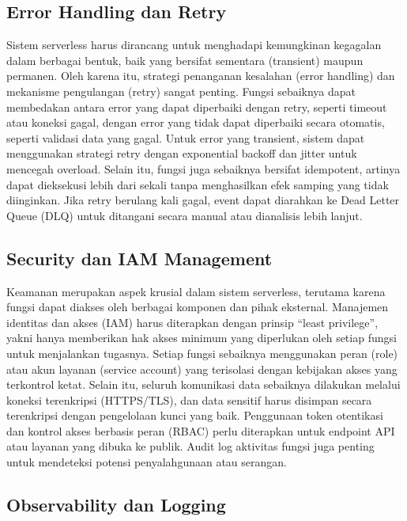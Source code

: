 \subsection{Error Handling dan Retry}

Sistem serverless harus dirancang untuk menghadapi kemungkinan kegagalan dalam berbagai bentuk, baik yang bersifat sementara (transient) maupun permanen. Oleh karena itu, strategi penanganan kesalahan (error handling) dan mekanisme pengulangan (retry) sangat penting. Fungsi sebaiknya dapat membedakan antara error yang dapat diperbaiki dengan retry, seperti timeout atau koneksi gagal, dengan error yang tidak dapat diperbaiki secara otomatis, seperti validasi data yang gagal. Untuk error yang transient, sistem dapat menggunakan strategi retry dengan exponential backoff dan jitter untuk mencegah overload. Selain itu, fungsi juga sebaiknya bersifat idempotent, artinya dapat dieksekusi lebih dari sekali tanpa menghasilkan efek samping yang tidak diinginkan. Jika retry berulang kali gagal, event dapat diarahkan ke Dead Letter Queue (DLQ) untuk ditangani secara manual atau dianalisis lebih lanjut.

\subsection{Security dan IAM Management}

Keamanan merupakan aspek krusial dalam sistem serverless, terutama karena fungsi dapat diakses oleh berbagai komponen dan pihak eksternal. Manajemen identitas dan akses (IAM) harus diterapkan dengan prinsip “least privilege”, yakni hanya memberikan hak akses minimum yang diperlukan oleh setiap fungsi untuk menjalankan tugasnya. Setiap fungsi sebaiknya menggunakan peran (role) atau akun layanan (service account) yang terisolasi dengan kebijakan akses yang terkontrol ketat. Selain itu, seluruh komunikasi data sebaiknya dilakukan melalui koneksi terenkripsi (HTTPS/TLS), dan data sensitif harus disimpan secara terenkripsi dengan pengelolaan kunci yang baik. Penggunaan token otentikasi dan kontrol akses berbasis peran (RBAC) perlu diterapkan untuk endpoint API atau layanan yang dibuka ke publik. Audit log aktivitas fungsi juga penting untuk mendeteksi potensi penyalahgunaan atau serangan.

\subsection{Observability dan Logging}

